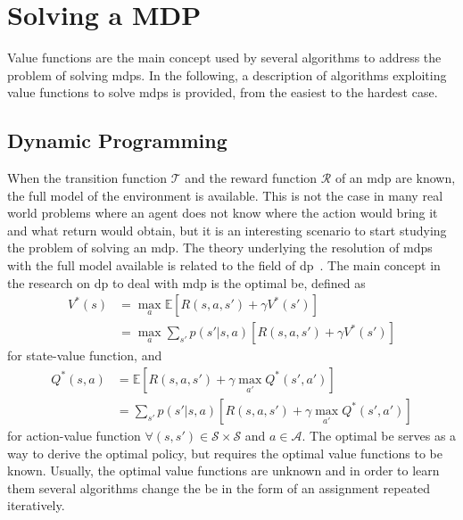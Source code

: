 \section{Solving a MDP}
Value functions are the main concept used by several algorithms to address the problem of solving \glspl{mdp}. In the following, a description of algorithms exploiting value functions to solve \glspl{mdp} is provided, from the easiest to the hardest case.

\subsection{Dynamic Programming}
When the transition function $\mathcal{T}$ and the reward function $\mathcal{R}$ of an \gls{mdp} are known, the full model of the environment is available. This is not the case in many real world problems where an agent does not know where the action would bring it and what return would obtain, but it is an interesting scenario to start studying the problem of solving an \gls{mdp}. The theory underlying the resolution of \glspl{mdp} with the full model available is related to the field of \gls{dp}~\cite{bertsekas2005dynamic, bellman2013dynamic}. The main concept in the research on \gls{dp} to deal with \gls{mdp} is the optimal \gls{be}, defined as
\begin{align}
 V^*(s) &= \max_a \mathbb{E}[R(s,a,s') + \gamma V^*(s')]\nonumber\\
        &= \max_a \sum_{s'} p(s' | s, a)[R(s,a,s') + \gamma V^*(s')]
\end{align}
for state-value function, and
\begin{align}
 Q^*(s,a) &= \mathbb{E}[R(s,a,s') + \gamma \max_{a'}Q^*(s', a')]\nonumber\\
          &= \sum_{s'} p(s' | s, a)[R(s,a,s') + \gamma \max_{a'}Q^*(s', a')]
\end{align}
for action-value function $\forall (s, s') \in \mathcal{S} \times \mathcal{S}$ and $a \in \mathcal{A}$.
The optimal \gls{be} serves as a way to derive the optimal policy, but requires the optimal value functions to be known. Usually, the optimal value functions are unknown and in order to learn them several algorithms change the \gls{be} in the form of an assignment repeated iteratively.

